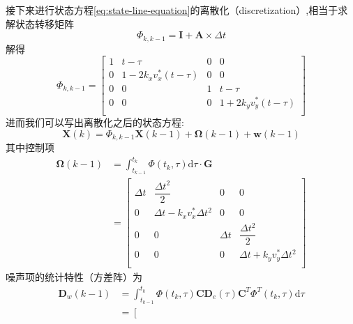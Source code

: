 \documentclass[cn,10pt,citestyle=gb7714-2015,bibstyle=gb7714-2015]{elegantbook}
\begin{document}
\begin{solution}
    接下来进行状态方程\eqref{eq:state-line-equation}的离散化（discretization）,相当于求解状态转移矩阵
    \begin{equation}
        \bm{\varPhi}_{k,k-1}=\bm{I}+\bm{A}\times\Delta t
    \end{equation}
    解得
    \begin{equation}\label{eq:transfer}
        \bm{\varPhi}_{k,k-1}=\left[ \begin{matrix}
            1&		t-\tau&		0&		0\\
            0&		1-2k_xv_{x}^{*}\left( t-\tau \right)&		0&		0\\
            0&		0&		1&		t-\tau\\
            0&		0&		0&		1+2k_yv_{y}^{*}\left( t-\tau \right)\\
        \end{matrix} \right] 
    \end{equation}
    进而我们可以写出离散化之后的状态方程:
    \begin{equation}
        \bm{X}(k)=\bm{\varPhi}_{k,k-1}\bm{X}(k-1)+\bm{\Omega}(k-1)+\bm{w}(k-1)
    \end{equation}
    其中控制项
    \begin{equation}\label{eq:control}
    \begin{aligned}
        \bm{\Omega} \left( k-1 \right) &=\int_{t_{k-1}}^{t_k}{\bm{\varPhi }\left( t_k,\tau \right)}\mathrm{d}\tau \cdot \bm{G}
    \\
    &=\left[ \begin{matrix}
        \Delta t&		\dfrac{\Delta t^2}{2}&		0&		0\\
        0&		\Delta t-k_xv_{x}^{*}\Delta t^2&		0&		0\\
        0&		0&		\Delta t&		\dfrac{\Delta t^2}{2}\\
        0&		0&		0&		\Delta t+k_yv_{y}^{*}\Delta t^2\\
    \end{matrix} \right] 
    \end{aligned}
    \end{equation}
    噪声项的统计特性（方差阵）为
    \begin{equation}\label{eq:noise-system}
        \begin{aligned}
            \bm{D}_w\left( k-1 \right) &=\int_{t_{k-1}}^{t_k}{\bm{\varPhi }\left( t_k,\tau \right) \bm{CD}_e\left( \tau \right) \bm{C}^T\bm{\varPhi }^T\left( t_k,\tau \right)}\mathrm{d}\tau 
            \\
            &=\left[ \begin{matrix}

\end{matrix}
\end{aligned}
\end{equation}
\end{solution}
\end{document}
